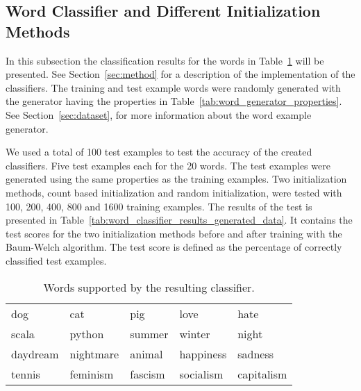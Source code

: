 \subsection{Word Classifier and Different Initialization Methods}\label{sec:word_classifier_results}
In this subsection the classification results for the words in Table~\ref{tab:words_supported_by_classifier} will be presented. 
See Section~\ref{sec:method} for a description of the implementation of the classifiers.
The training and test example words were randomly generated with the generator having the properties in Table~\ref{tab:word_generator_properties}.
See Section~\ref{sec:dataset}, for more information about the word example generator. 

We used a total of 100 test examples to test the accuracy of the created classifiers.
Five test examples each for the 20 words. 
The test examples were generated using the same properties as the training examples.
Two initialization methods, count based initialization and random initialization, were tested with 100, 200, 400, 800 and 1600 training examples. 
The results of the test is presented in Table~\ref{tab:word_classifier_results_generated_data}. 
It contains the test scores for the two initialization methods before and after training with the Baum-Welch algorithm. 
The test score is defined as the percentage of correctly classified test examples.

\begin{table}[htb]
  \begin{center}
  \begin{tabular}{ l l l l l }
    dog      & cat       & pig     & love       & hate  \\
    scala    & python    & summer  & winter     & night  \\ 
    daydream & nightmare & animal  & happiness  & sadness \\ 
    tennis   & feminism  & fascism & socialism  & capitalism \\
  \end{tabular}
\end{center}
\caption{Words supported by the resulting classifier.} 
\label{tab:words_supported_by_classifier} 
\end{table}

